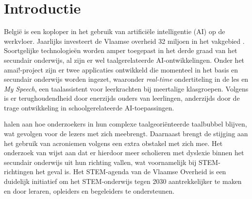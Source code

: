 
\section{Introductie}%
\label{sec:introductie}

België is een koploper in het gebruik van artificiële intelligentie (AI) op de werkvloer. Jaarlijks investeert de Vlaamse overheid 32 miljoen in het vakgebied \autocite{Crevits2022}. Soortgelijke technologieën worden amper toegepast in het derde graad van het secundair onderwijs, al zijn er wel taalgerelateerde AI-ontwikkelingen. Onder het amai!-project  zijn er twee applicaties ontwikkeld die momenteel in het basis en secundair onderwijs worden ingezet, waaronder \textit{real-time} ondertiteling in de les en \textit{My Speech}, een taalassistent voor leerkrachten bij meertalige klasgroepen. Volgens \textcite{Martens2021} is er terughoudendheid door enerzijds ouders van leerlingen, anderzijds door de trage ontwikkeling in schoolgerelateerde AI-toepassingen.

\textcite{PlavenSigray2017} halen aan hoe onderzoekers in hun complexe taalgeoriënteerde taalbubbel blijven, wat gevolgen voor de lezers met zich meebrengt. Daarnaast brengt de stijging aan het gebruik van acroniemen volgens \textcite{Barnett2020} een extra obstakel met zich mee. Het onderzoek van \textcite{Donato2022} wijst aan dat er hierdoor meer scholieren met dyslexie binnen het secundair onderwijs uit hun richting vallen, wat voornamelijk bij STEM-richtingen het geval is. Het STEM-agenda  van de Vlaamse Overheid is een duidelijk initiatief om het STEM-onderwijs tegen 2030 aantrekkelijker te maken en door leraren, opleiders en begeleiders te ondersteunen.



